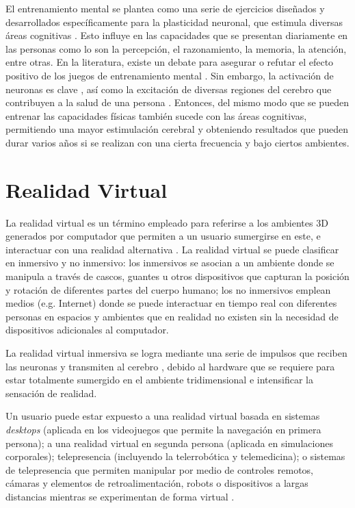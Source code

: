 \documentclass[conference]{IEEEtran}
\begin{document}
El entrenamiento mental se plantea como una serie de ejercicios diseñados y desarrollados específicamente para la plasticidad neuronal, que estimula diversas áreas cognitivas \cite{BRAIN1}. Esto influye en las capacidades que se presentan diariamente en las personas como lo son la percepción, el razonamiento, la memoria, la atención, entre otras.  En la literatura, existe un debate para asegurar o refutar el efecto positivo de los juegos de entrenamiento mental \cite{WORKS1, WORKS2, WORKS3}. Sin embargo, la activación de neuronas es clave \cite{BRAIN2}, así como la excitación de diversas regiones del cerebro que contribuyen a la salud de una persona \cite{POSI1, BUIT}. Entonces, del mismo modo que se pueden entrenar las capacidades físicas también sucede con las áreas cognitivas, permitiendo una mayor estimulación cerebral y obteniendo resultados que pueden durar varios años si se realizan con una cierta frecuencia y bajo ciertos ambientes.


\section{Realidad Virtual} \label{virtual}

La realidad virtual es un término empleado para referirse a los ambientes 3D generados por computador que permiten a un usuario sumergirse en este, e interactuar con una realidad alternativa \cite{VR1}. La realidad virtual se puede clasificar en inmersivo y no inmersivo: los inmersivos se asocian a un ambiente donde se manipula a través de cascos, guantes u otros dispositivos que capturan la posición y rotación de diferentes partes del cuerpo humano; los no inmersivos emplean medios (e.g. Internet) donde se puede interactuar en tiempo real con diferentes personas en espacios y ambientes que en realidad no existen sin la necesidad de dispositivos adicionales al computador.

La realidad virtual inmersiva se logra mediante una serie de impulsos que reciben las neuronas y transmiten al cerebro \cite{Plass-OudeBos2010}, debido al hardware que se requiere para estar totalmente sumergido en el ambiente tridimensional e intensificar la sensación de realidad.

Un usuario puede estar expuesto a una realidad virtual basada en sistemas \textit{desktops} (aplicada en los videojuegos que permite la navegación en primera persona); a una realidad virtual en segunda persona (aplicada en simulaciones corporales); telepresencia  (incluyendo la telerrobótica y telemedicina); o sistemas de telepresencia que permiten manipular por medio de controles remotos, cámaras y elementos de retroalimentación, robots o dispositivos a largas distancias mientras se experimentan de forma virtual \cite{LECUYER}.
\end{document}
